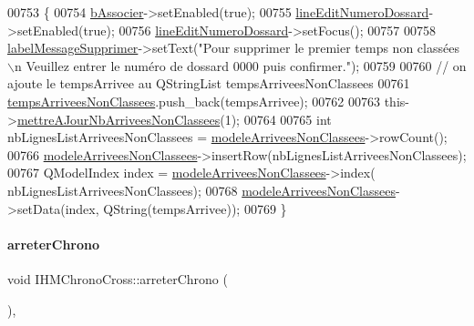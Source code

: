 \begin{DoxyCode}
00753 \{
00754     \hyperlink{class_i_h_m_chrono_cross_aec2458a0c2ff0d2c37fa409fb8e99ce7}{bAssocier}->setEnabled(\textcolor{keyword}{true});
00755     \hyperlink{class_i_h_m_chrono_cross_ad2e156ff9412644debf8da7a3ec1566d}{lineEditNumeroDossard}->setEnabled(\textcolor{keyword}{true});
00756     \hyperlink{class_i_h_m_chrono_cross_ad2e156ff9412644debf8da7a3ec1566d}{lineEditNumeroDossard}->setFocus();
00757 
00758     \hyperlink{class_i_h_m_chrono_cross_a6d818ff507406ebf299c571e0e5c1e49}{labelMessageSupprimer}->setText(\textcolor{stringliteral}{"Pour supprimer le premier temps non classées \(\backslash\)n
      Veuillez entrer le numéro de dossard 0000 puis confirmer."});
00759 
00760     \textcolor{comment}{// on ajoute le tempsArrivee au QStringList tempsArriveesNonClassees}
00761     \hyperlink{class_i_h_m_chrono_cross_a9d0542a5334cd284d1ea9cf732cb013e}{tempsArriveesNonClassees}.push\_back(tempsArrivee);
00762 
00763     this->\hyperlink{class_i_h_m_chrono_cross_a1b23fda62742f2dd17652d3abcb33dd6}{mettreAJourNbArriveesNonClassees}(1);
00764 
00765     \textcolor{keywordtype}{int} nbLignesListArriveesNonClassees = \hyperlink{class_i_h_m_chrono_cross_a12a210c6a93f70df764841b7d322b05c}{modeleArriveesNonClassees}->rowCount();
00766     \hyperlink{class_i_h_m_chrono_cross_a12a210c6a93f70df764841b7d322b05c}{modeleArriveesNonClassees}->insertRow(nbLignesListArriveesNonClassees);
00767     QModelIndex index = \hyperlink{class_i_h_m_chrono_cross_a12a210c6a93f70df764841b7d322b05c}{modeleArriveesNonClassees}->index(
      nbLignesListArriveesNonClassees);
00768     \hyperlink{class_i_h_m_chrono_cross_a12a210c6a93f70df764841b7d322b05c}{modeleArriveesNonClassees}->setData(index, QString(tempsArrivee));
00769 \}
\end{DoxyCode}
\mbox{\label{class_i_h_m_chrono_cross_a8d5c89a4d2ca34252acd8737e29d37fe}} 
\paragraph{\texorpdfstring{arreter\+Chrono}{arreterChrono}}
{\footnotesize\ttfamily void I\+H\+M\+Chrono\+Cross\+::arreter\+Chrono (\begin{DoxyParamCaption}{ }\end{DoxyParamCaption})\hspace{0.3cm}{\ttfamily [private]}, {\ttfamily [slot]}}



